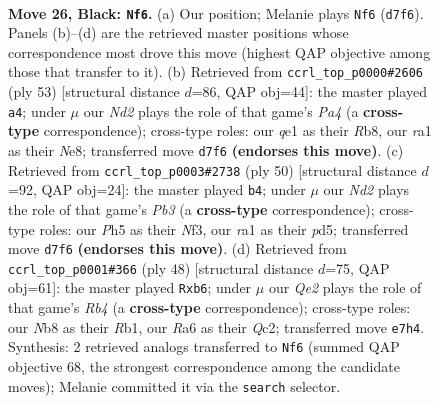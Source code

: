 \documentclass[11pt]{article}
\begin{document}
\clearpage

\begin{figure}[p]\centering
\begin{subfigure}{0.46\textwidth}\centering
\resizebox{\linewidth}{!}{%
\newchessgame
\chessboard[
  setfen={1n2r1k1/3nqpp1/rp1pb3/4p2p/P3P2N/2N3P1/B1P2P1P/R1R1Q1K1 b - - 14 26},
  showmover=false,
  pgfstyle=straightmove, color=movearrow, markmove={d7-f6}
]}
\caption{}
\end{subfigure}\hfill
\begin{subfigure}{0.46\textwidth}\centering
\resizebox{\linewidth}{!}{%
\newchessgame
\chessboard[
  setfen={1r2n1k1/2qb1pp1/3pp2r/p7/1n2PP1p/1PN1QN1P/1KPR2P1/4RB2 b - - 1 27},
  showmover=false,
  pgfstyle=straightmove, color=movearrow, markmove={a5-a4}
]}
\caption{}
\end{subfigure}
\\[4pt]
\begin{subfigure}{0.46\textwidth}\centering
\resizebox{\linewidth}{!}{%
\newchessgame
\chessboard[
  setfen={2r3k1/2bq2pp/2p1rp2/p2p4/3Pn3/1P1Q1N2/P1R2PPP/3RB1K1 w - - 4 26},
  showmover=false,
  pgfstyle=straightmove, color=movearrow, markmove={b3-b4}
]}
\caption{}
\end{subfigure}\hfill
\begin{subfigure}{0.46\textwidth}\centering
\resizebox{\linewidth}{!}{%
\newchessgame
\chessboard[
  setfen={r3r1k1/2q2npp/bpp2p2/n3p3/PR2P2P/3B1N2/2QN1PP1/1R4K1 w - - 1 25},
  showmover=false,
  pgfstyle=straightmove, color=movearrow, markmove={b4-b6}
]}
\caption{}
\end{subfigure}
\caption{\textbf{Move 26, Black: \texttt{Nf6}.} (a) Our position; Melanie plays \texttt{Nf6} (\texttt{d7f6}). Panels (b)--(d) are the retrieved master positions whose correspondence most drove this move (highest QAP objective among those that transfer to it). (b) Retrieved from \texttt{ccrl\_top\_p0000\#2606} (ply 53) [structural distance $d$=86, QAP obj=44]: the master played \texttt{a4}; under $\mu$ our \emph{Nd2} plays the role of that game's \emph{Pa4} (a \textbf{cross-type} correspondence); cross-type roles: our \emph{q}e1 as their \emph{R}b8, our \emph{r}a1 as their \emph{N}e8; transferred move \texttt{d7f6} \textbf{(endorses this move)}. (c) Retrieved from \texttt{ccrl\_top\_p0003\#2738} (ply 50) [structural distance $d$=92, QAP obj=24]: the master played \texttt{b4}; under $\mu$ our \emph{Nd2} plays the role of that game's \emph{Pb3} (a \textbf{cross-type} correspondence); cross-type roles: our \emph{P}h5 as their \emph{N}f3, our \emph{r}a1 as their \emph{p}d5; transferred move \texttt{d7f6} \textbf{(endorses this move)}. (d) Retrieved from \texttt{ccrl\_top\_p0001\#366} (ply 48) [structural distance $d$=75, QAP obj=61]: the master played \texttt{Rxb6}; under $\mu$ our \emph{Qe2} plays the role of that game's \emph{Rb4} (a \textbf{cross-type} correspondence); cross-type roles: our \emph{N}b8 as their \emph{R}b1, our \emph{R}a6 as their \emph{Q}c2; transferred move \texttt{e7h4}. Synthesis: 2 retrieved analogs transferred to \texttt{Nf6} (summed QAP objective 68, the strongest correspondence among the candidate moves); Melanie committed it via the \texttt{search} selector.}
\label{fig:thought-m51}
\end{figure}
\end{document}
